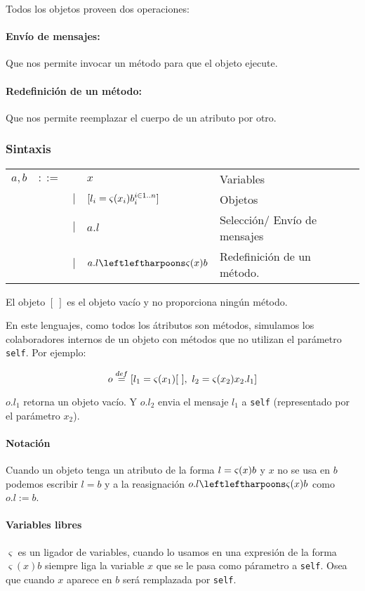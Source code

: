 Todos los objetos proveen dos operaciones:

\paragraph{Envío de mensajes:} Que nos permite invocar un método para que el objeto ejecute.

\paragraph{Redefinición de un método:} Que nos permite reemplazar el cuerpo de un atributo por otro.

\subsubsection{Sintaxis}
\begin{tabular}{lllll}
	$a,b$ &$::=$& &$x$ & Variables \\
 	      &     & $|$ &$[l_i = \varsigma(x_i)b_i^{i\in1..n}]$ &  Objetos\\
 	      &     & $|$ &$a.l$ &  Selección/ Envío de mensajes \\
 	      &     & $|$ &$\OORedefinicion{a.l}{x}{b}$ &  Redefinición de un método.	       	       	      
\end{tabular}

\vspace*{5mm}
El objeto $[~]$ es el objeto vacío y no proporciona ningún método.

En este lenguajes, como todos los átributos son métodos, simulamos los colaboradores internos de un objeto con métodos que no utilizan el parámetro \texttt{self}. Por ejemplo:

$$o \overset{def}{=} [l_1 = \varsigma(x_1)[~],~
				l_2 = \varsigma(x_2)x_2.l_1]$$

$o.l_1$ retorna un objeto vacío. Y $o.l_2$ envia el mensaje $l_1$ a \texttt{self} (representado por el parámetro $x_2$). 

\paragraph{Notación} Cuando un objeto tenga un atributo de la forma $l = \varsigma(x)b$ y $x$ no se usa en $b$ podemos escribir $l = b$ y a la reasignación $\OORedefinicion{o.l}{x}{b}$ como $o.l := b$.

\paragraph{Variables libres}
$\varsigma$ es un ligador de variables, cuando lo usamos en una expresión de la forma $\varsigma(x)b$ siempre liga la variable $x$ que se le pasa como párametro a \texttt{self}. Osea que cuando $x$ aparece en $b$ será remplazada por \texttt{self}.

